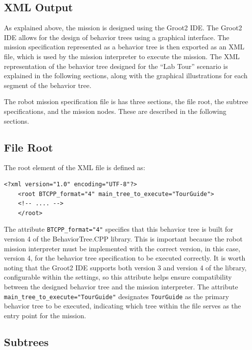\documentclass{CSSRforAfrica}
\begin{document}
\subsection{XML Output}
\label{section:xml_output}

As explained above, the mission is designed using the Groot2 IDE. The Groot2 IDE allows for the design of behavior trees using a graphical interface. The mission specification represented as a behavior tree is then exported as an XML file, which is used by the mission interpreter to execute the mission. 
The XML representation of the behavior tree designed for the ``Lab Tour'' scenario is explained in the following sections, along with the graphical illustrations for each segment of the behavior tree.

The robot mission specification file is has three sections, the file root, the subtree specifications, and the mission nodes. These are described in the following sections.

\newpage
\subsection{File Root}
\label{section:file_root}
The root element of the XML file is defined as:
\begin{lstlisting}[style=XMLStyle, language=XMLCustom]
    <?xml version="1.0" encoding="UTF-8"?>
    <root BTCPP_format="4" main_tree_to_execute="TourGuide">
    <!-- .... -->
    </root>
\end{lstlisting}
The attribute \texttt{BTCPP\_format="4"} specifies that this behavior tree is built for version 4 of the BehaviorTree.CPP library.
This is important because the robot mission interpreter must be implemented with the correct version, in this case, version 4, for the behavior tree specification to be executed correctly. It is worth noting that the Groot2 IDE supports both version 3 and version 4 of the library, configurable within the settings, so this attribute helps ensure compatibility between the designed behavior tree and the mission interpreter. The attribute \texttt{main\_tree\_to\_execute="TourGuide"} designates \texttt{TourGuide} as the primary behavior tree to be executed, indicating which tree within the file serves as the entry point for the mission.

 \vspace{-1mm}
\subsection{Subtrees}
\label{section:subtrees}
 
\end{document}
